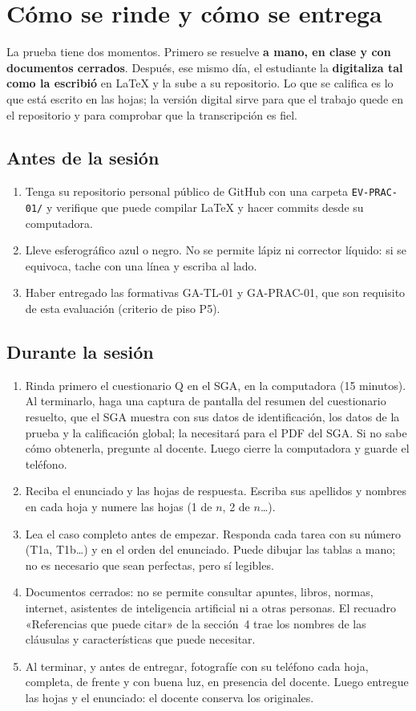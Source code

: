 \documentclass[11pt]{article}
\newcommand{\seccion}[1]{\section{\textcolor{utegreendk}{#1}}}
\newcommand{\subseccion}[1]{\subsection{\textcolor{midblue}{#1}}}
\begin{document}
\seccion{Cómo se rinde y cómo se entrega}

La prueba tiene dos momentos. Primero se resuelve \textbf{a mano, en clase y con documentos cerrados}. Después, ese mismo día, el estudiante la \textbf{digitaliza tal como la escribió} en \LaTeX{} y la sube a su repositorio. Lo que se califica es lo que está escrito en las hojas; la versión digital sirve para que el trabajo quede en el repositorio y para comprobar que la transcripción es fiel.

\subseccion{Antes de la sesión}

\begin{enumerate}[leftmargin=18pt,itemsep=2pt]
	\item Tenga su repositorio personal público de GitHub con una carpeta \texttt{EV-PRAC-01/} y verifique que puede compilar \LaTeX{} y hacer commits desde su computadora.
	\item Lleve esferográfico azul o negro. No se permite lápiz ni corrector líquido: si se equivoca, tache con una línea y escriba al lado.
	\item Haber entregado las formativas GA-TL-01 y GA-PRAC-01, que son requisito de esta evaluación (criterio de piso P5).
\end{enumerate}

\subseccion{Durante la sesión}

\begin{enumerate}[leftmargin=18pt,itemsep=2pt]
	\item Rinda primero el cuestionario Q en el SGA, en la computadora (15 minutos). Al terminarlo, haga una captura de pantalla del resumen del cuestionario resuelto, que el SGA muestra con sus datos de identificación, los datos de la prueba y la calificación global; la necesitará para el PDF del SGA. Si no sabe cómo obtenerla, pregunte al docente. Luego cierre la computadora y guarde el teléfono.
	\item Reciba el enunciado y las hojas de respuesta. Escriba sus apellidos y nombres en cada hoja y numere las hojas (1 de $n$, 2 de $n$\ldots).
	\item Lea el caso completo antes de empezar. Responda cada tarea con su número (T1a, T1b\ldots) y en el orden del enunciado. Puede dibujar las tablas a mano; no es necesario que sean perfectas, pero sí legibles.
	\item Documentos cerrados: no se permite consultar apuntes, libros, normas, internet, asistentes de inteligencia artificial ni a otras personas. El recuadro «Referencias que puede citar» de la sección~4 trae los nombres de las cláusulas y características que puede necesitar.
	\item Al terminar, y antes de entregar, fotografíe con su teléfono cada hoja, completa, de frente y con buena luz, en presencia del docente. Luego entregue las hojas y el enunciado: el docente conserva los originales.
\end{enumerate}
\end{document}

